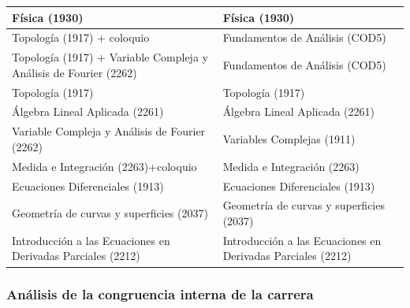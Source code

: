 \documentclass[a4paper, 12pt]{article}
\begin{document}
\begin{center}
\begin{tabularx}{1\textwidth}{|>{\raggedright\arraybackslash}X |
>{\raggedright\arraybackslash}X |}
Física          (1930)                & Física    (1930)             \\ \hline

Topología   (1917) + coloquio & Fundamentos de Análisis   (COD5)                      \\
\hline
Topología   (1917) + Variable Compleja y Análisis de Fourier (2262) & Fundamentos de Análisis   (COD5)                      \\
\hline



Topología   (1917)                &Topología   (1917)       \\
\hline

Álgebra Lineal Aplicada (2261)      & Álgebra Lineal Aplicada (2261)       \\\hline

Variable Compleja y Análisis de Fourier (2262)  & Variables Complejas (1911)               \\
\hline

Medida e Integración (2263)+coloquio   & Medida e Integración (2263) \\
\hline

Ecuaciones Diferenciales    (1913)     &Ecuaciones Diferenciales (1913)   \\
\hline

Geometría de curvas y superficies  (2037)  & Geometría de curvas y superficies  (2037)
\\\hline

Introducción a las Ecuaciones en Derivadas Parciales (2212) & 
Introducción a las Ecuaciones en Derivadas Parciales (2212)
\\\hline
\end{tabularx}
\end{center}

\normalfont
\newpage


\subsubsection{Análisis de la congruencia interna de la carrera}
\fontsize{10pt}{10pt}\selectfont 
 
\end{document}
